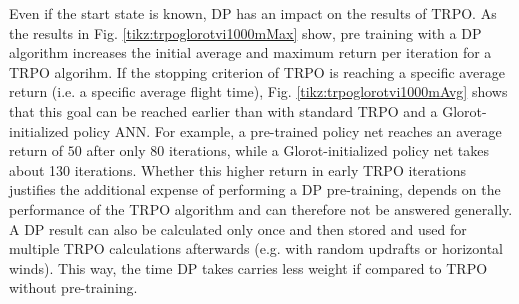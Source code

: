 Even if the start state is known, DP has an impact on the results of TRPO. As the results in Fig. \ref{tikz:trpoglorotvi1000mMax} show, pre training with a DP algorithm increases the initial average and maximum return per iteration for a TRPO algorihm. If the stopping criterion of TRPO is reaching a specific average return (i.e. a specific average flight time), Fig. \ref{tikz:trpoglorotvi1000mAvg} shows that this goal can be reached earlier than with standard TRPO and a Glorot-initialized policy ANN. For example, a pre-trained policy net reaches an average return of $50$ after only 80 iterations, while a Glorot-initialized policy net takes about 130 iterations. Whether this higher return in early TRPO iterations justifies the additional expense of performing a DP pre-training, depends on the performance of the TRPO algorithm and can therefore not be answered generally. A DP result can also be calculated only once and then stored and used for multiple TRPO calculations afterwards (e.g. with random updrafts or horizontal winds). This way, the time DP takes carries less weight if compared to TRPO without pre-training.
